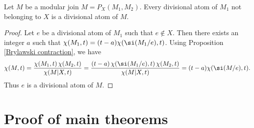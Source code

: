 \begin{Lemma}\label{divisional atom of modular join}
Let $ M $ be a modular join $ M = P_{X}(M_{1},M_{2}) $.
Every divisional atom of $ M_{1} $ not belonging to $ X $ is a divisional atom of $ M $.
\end{Lemma}
\begin{proof}
Let $ e $ be a divisional atom of $ M_{1} $ such that $ e \not\in X $.
Then there exists an integer $ a $ such that $ \chi(M_{1},t) = (t-a)\chi(\si(M_{1}/e),t) $.
Using Proposition \ref{Brylawski contraction}, we have
\begin{align*}
\chi(M,t) = \dfrac{\chi(M_{1},t) \, \chi(M_{2},t)}{\chi(M|X,t)}
= \dfrac{(t-a) \, \chi(\si(M_{1}/e),t) \, \chi(M_{2},t)}{\chi(M|X,t)}
= (t-a)\chi(\si(M/e),t).
\end{align*}
Thus $ e $ is a divisional atom of $ M $.
\end{proof}

\section{Proof of main theorems}\label{sec: proof}

